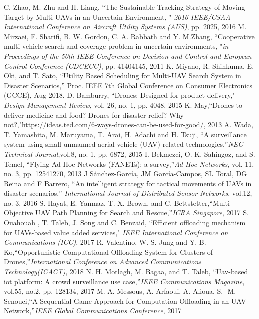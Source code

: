\documentclass{ieeeaccess}
\begin{document}
\begin{thebibliography}{1}
 C. Zhao, M. Zhu and H. Liang, ``The Sustainable Tracking Strategy of Moving Target by Multi-UAVs in an Uncertain Environment, " \emph{2016 IEEE/CSAA International Conference on Aircraft Utility Systems (AUS)}, pp. 2025, 2016
 M. Mirzaei, F. Sharifi, B. W. Gordon, C. A. Rabbath and  Y. M.Zhang, ``Cooperative multi-vehicle search and coverage problem in uncertain environments, "\emph{in Proceedings of the 50th IEEE Conference on Decision and Control and European Control Conference (CDCECC)}, pp. 41404145, 2011
%
  K. Miyano, R. Shinkuma, E. Oki, and T. Sato, ``Utility Based Scheduling for Multi-UAV Search System in Disaster Scenarios,'' Proc. IEEE 7th Global Conference on Consumer Electronics (GCCE), Aug 2018.
 D. Bamburry, ``Drones: Designed for product delivery," \emph{Design Management Review}, vol. 26, no. 1, pp. 4048, 2015
 K. May,``Drones to deliver medicine and food? Drones for disaster relief? Why not?,"\url{https://ideas.ted.com/6-ways-drones-can-be-used-for-good/}, 2013
 A. Wada, T. Yamashita, M. Maruyama, T. Arai, H. Adachi and H. Tsuji, ``A surveillance system using small unmanned aerial vehicle (UAV) related technologies,''\emph{NEC Technical Journal},vol.8, no. 1, pp. 6872, 2015
 I. Bekmezci, O. K. Sahingoz, and S. Temel, ``Flying Ad-Hoc Networks (FANETs): a survey,''\emph{Ad Hoc Networks}, vol. 11, no. 3, pp. 12541270, 2013
 J S\'anchez-Garc\'ia, JM Garc\'ia-Campos, SL Toral, DG Reina and F Barrero, ``An intelligent strategy for tactical movements of UAVs in disaster scenarios,''\emph{
International Journal of Distributed Sensor Networks}, vol.12, no. 3, 2016
 S. Hayat, E. Yanmaz, T. X. Brown, and C. Bettstetter,``Multi-Objective UAV Path Planning for Search and Rescue,''\emph{ICRA Singapore}, 2017 
%
S. Ouahouah , T. Taleb, J. Song and C. Benzaid, ``Efficient offloading mechanism for UAVs-based value added services," \emph{IEEE International Conference on Communications (ICC)}, 2017
 R. Valentino, W.-S. Jung and Y.-B. Ko,``Opportunistic Computational Offloading System for Clusters of Drones,''\emph{International Conference on Advanced Communications Technology(ICACT)}, 2018 
%
N. H. Motlagh, M. Bagaa, and T. Taleb, ``Uav-based iot platform: A crowd surveillance use case,''\emph{IEEE Communications Magazine}, vol.55, no.2, pp. 128134, 2017
%
 M.-A. Messous, A. Arfaoui, A. Alioua, S. -M. Senouci,``A Sequential Game Approach for Computation-Offloading in an UAV Network,''\emph{IEEE Global Communications Conference}, 2017 

\end{thebibliography}
\end{document}
